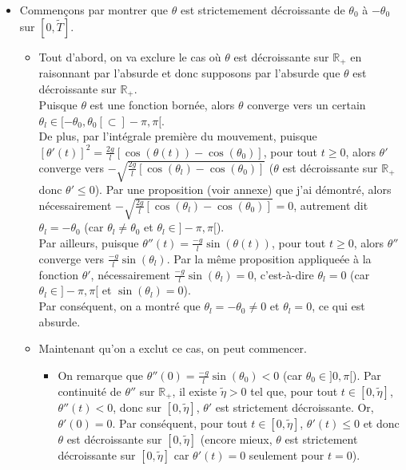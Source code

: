 \documentclass[9pt,a4paper]{article}
\begin{document}
\begin{itemize}[label=\textbullet]
    \item Commençons par montrer que $\theta$ est strictemement décroissante de $\theta_0$ à $-\theta_0$ sur $[0, \tilde{T}]$.
    \begin{itemize}[label=\textbullet]
        \item Tout d'abord, on va exclure le cas où $\theta$ est décroissante sur $\mathbb{R}_+$ en raisonnant par l'absurde et donc supposons par l'absurde que $\theta$ est décroissante sur $\mathbb{R}_+$.\\
        Puisque $\theta$ est une fonction bornée, alors $\theta$ converge vers un certain $\theta_l \in [-\theta_0, \theta_0[ \subset ]-\pi, \pi[$.\\
        De plus, par l'intégrale première du mouvement, puisque $[\theta'(t)]^2 = \frac{2g}{l}[\cos(\theta(t)) - \cos(\theta_0)]$, pour tout $t \geq 0$, alors $\theta'$ converge vers $-\sqrt{\frac{2g}{l}[\cos(\theta_l) - \cos(\theta_0)]}$ ($\theta$ est décroissante sur $\mathbb{R}_+$ donc $\theta' \leq 0$). Par une proposition (voir annexe) que j'ai démontré, alors nécessairement $-\sqrt{\frac{2g}{l}[\cos(\theta_l) - \cos(\theta_0)]} = 0$, autrement dit $\theta_l = -\theta_0$ (car $\theta_l \neq \theta_0$ et $\theta_l \in ]-\pi, \pi[$).\\
        Par ailleurs, puisque $\theta''(t) = \frac{-g}{l}\sin(\theta(t))$, pour tout $t \geq 0$, alors $\theta''$ converge vers $\frac{-g}{l}\sin(\theta_l)$. Par la même proposition appliqueée à la fonction $\theta'$, nécessairement $\frac{-g}{l}\sin(\theta_l) = 0$, c'est-à-dire $\theta_l = 0$ (car $\theta_l \in ]-\pi, \pi[$ et $\sin(\theta_l) = 0$).\\
        Par conséquent, on a montré que $\theta_l = -\theta_0 \neq 0$ et $\theta_l = 0$, ce qui est absurde.
        \item Maintenant qu'on a exclut ce cas, on peut commencer.
        \begin{itemize}[label=\textbullet]
            \item On remarque que $\theta''(0) = \frac{-g}{l}\sin(\theta_0) < 0$ (car $\theta_0 \in ]0, \pi[$). Par continuité de $\theta''$ sur $\mathbb{R}_+$, il existe $\tilde{\eta} > 0$ tel que, pour tout $t \in [0, \tilde{\eta}]$, $\theta''(t) < 0$, donc sur $[0, \tilde{\eta}]$, $\theta'$ est strictement décroissante. Or, $\theta'(0) = 0$. Par conséquent, pour tout $t \in [0, \tilde{\eta}]$, $\theta'(t) \leq 0$ et donc $\theta$ est décroissante sur $[0, \tilde{\eta}]$ (encore mieux, $\theta$ est strictement décroissante sur $[0, \tilde{\eta}]$ car $\theta'(t) = 0$ seulement pour $t = 0$).

\end{itemize}
\end{itemize}
\end{itemize}
\end{document}
